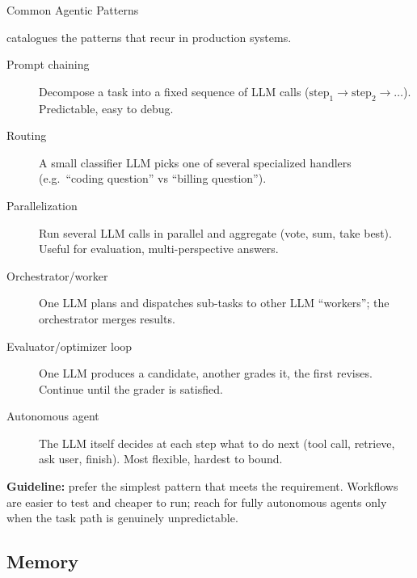 \begin{frame}{Common Agentic Patterns}

  \cite{anthropic2024agents} catalogues the patterns that recur in production systems.

  \vspace{0.3em}
  \begin{description}
    \item[Prompt chaining] Decompose a task into a fixed sequence of LLM calls
      ($\text{step}_1 \to \text{step}_2 \to \ldots$). Predictable, easy to debug.
    \item[Routing] A small classifier LLM picks one of several specialized
      handlers (e.g.\ ``coding question'' vs ``billing question'').
    \item[Parallelization] Run several LLM calls in parallel and aggregate
      (vote, sum, take best). Useful for evaluation, multi-perspective answers.
    \item[Orchestrator/worker] One LLM plans and dispatches sub-tasks to other
      LLM ``workers''; the orchestrator merges results.
    \item[Evaluator/optimizer loop] One LLM produces a candidate, another
      grades it, the first revises. Continue until the grader is satisfied.
    \item[Autonomous agent] The LLM itself decides at each step what to do
      next (tool call, retrieve, ask user, finish). Most flexible, hardest to bound.
  \end{description}

  \vspace{0.4em}
  \textbf{Guideline:} prefer the simplest pattern that meets the requirement.
  Workflows are easier to test and cheaper to run; reach for fully autonomous
  agents only when the task path is genuinely unpredictable.
\end{frame}

\subsection{Memory}

